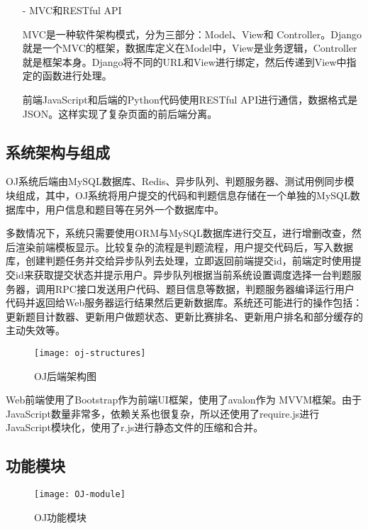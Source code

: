 \begin{itemize}
\item[-]MVC和RESTful API
 
MVC是一种软件架构模式，分为三部分：Model、View和 Controller。Django就是一个MVC的框架，数据库定义在Model中，View是业务逻辑，Controller就是框架本身。Django将不同的URL和View进行绑定，然后传递到View中指定的函数进行处理。

前端JavaScript和后端的Python代码使用RESTful API进行通信，数据格式是JSON。这样实现了复杂页面的前后端分离。

\end{itemize}

\subsection{系统架构与组成}

OJ系统后端由MySQL数据库、Redis、异步队列、判题服务器、测试用例同步模块组成，其中，OJ系统将用户提交的代码和判题信息存储在一个单独的MySQL数据库中，用户信息和题目等在另外一个数据库中。

多数情况下，系统只需要使用ORM与MySQL数据库进行交互，进行增删改查，然后渲染前端模板显示。比较复杂的流程是判题流程，用户提交代码后，写入数据库，创建判题任务并交给异步队列去处理，立即返回前端提交id，前端定时使用提交id来获取提交状态并提示用户。异步队列根据当前系统设置调度选择一台判题服务器，调用RPC接口发送用户代码、题目信息等数据，判题服务器编译运行用户代码并返回给Web服务器运行结果然后更新数据库。系统还可能进行的操作包括：更新题目计数器、更新用户做题状态、更新比赛排名、更新用户排名和部分缓存的主动失效等。

\begin{figure}[H]
\centering
\texttt{[image: oj-structures]}
\caption{OJ后端架构图}
\end{figure}

Web前端使用了Bootstrap作为前端UI框架，使用了avalon作为 MVVM框架。由于JavaScript数量非常多，依赖关系也很复杂，所以还使用了require.js进行JavaScript模块化，使用了r.js进行静态文件的压缩和合并。

\subsection{功能模块}

\begin{figure}[H]
\centering
\texttt{[image: OJ-module]}
\caption{OJ功能模块}
\end{figure}

